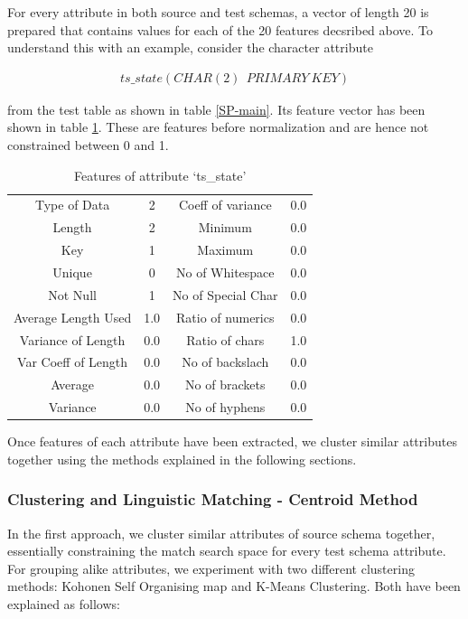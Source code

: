 \documentclass[conference]{IEEEtran}
\begin{document}
For every attribute in both source and test schemas, a vector of length 20 is prepared that contains values for each of the 20 features decsribed above. To understand this with an example, consider the character attribute 

\noindent
\begin{align*}
ts\_state (CHAR(2)\ \ PRIMARY\ KEY)  
\end{align*}

\noindent
from the test table as shown in table \ref{SP-main}. Its feature vector has been shown in table \ref{features}. These are features before normalization and are hence not constrained between 0 and 1.

\begin{table}[h]
\centering
\caption{Features of attribute `ts\_state'}
\begin{tabular}{|c|c|c|c|}
\hline
Type of Data & 2 & Coeff of variance & 0.0\\
Length & 2 & Minimum & 0.0\\
Key & 1 & Maximum & 0.0\\
Unique & 0 & No of Whitespace & 0.0\\
Not Null & 1 & No of Special Char & 0.0\\
Average Length Used & 1.0 & Ratio of numerics & 0.0\\
Variance of Length & 0.0 & Ratio of chars & 1.0\\	
Var Coeff of Length & 0.0 & No of backslach & 0.0\\
Average & 0.0 & No of brackets & 0.0\\
Variance & 0.0 & No of hyphens & 0.0\\
\hline
\end{tabular}
\label{features}
\end{table}

Once features of each attribute have been extracted, we cluster similar attributes together using the methods explained in the following sections.

\subsubsection*{\textbf{Clustering and Linguistic Matching - Centroid Method}}

In the first approach, we cluster similar attributes of source schema together, essentially constraining the match search space for every test schema attribute.  For grouping alike attributes, we experiment with two different clustering methods: Kohonen Self Organising map and K-Means Clustering. Both have been explained as follows:
\end{document}
